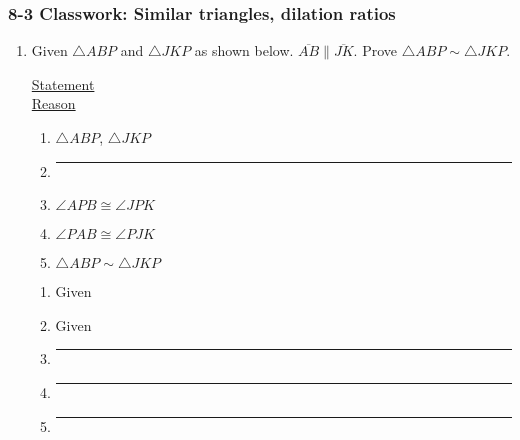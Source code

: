 \documentclass[12pt, twoside]{article}
\begin{document}
\subsubsection*{8-3 Classwork: Similar triangles, dilation ratios}
 \begin{enumerate}

\item Given $\triangle ABP$ and $\triangle JKP$ as shown below. $\overline{AB} \parallel \overline{JK}$. Prove $\triangle ABP \sim \triangle JKP$.\\[0.25cm]

  \begin{multicols}{2}
    \underline{Statement} \\
    \underline{Reason}
  \end{multicols}
  \begin{multicols}{2}
    \raggedcolumns
    \begin{enumerate}[label={\arabic*)}]
      \item $\triangle ABP$, $\triangle JKP$ \vspace{0.3cm}
      \item \rule{4cm}{0.15mm} \vspace{0.3cm}
      \item $\angle APB \cong \angle JPK$  \vspace{0.3cm}
      \item $\angle PAB \cong \angle PJK$ \vspace{0.3cm}
      \item $\triangle ABP \sim \triangle JKP$ \vspace{0.3cm}
    \end{enumerate}
    \begin{enumerate}[label={\arabic*)}]
      \item Given \vspace{0.3cm}
      \item Given \vspace{0.3cm}
      \item \rule{4cm}{0.15mm} \vspace{0.3cm}
      \item \rule{4cm}{0.15mm} \vspace{0.3cm}
      \item \rule{4cm}{0.15mm} \vspace{0.3cm}
    \end{enumerate}
  \end{multicols}


\end{enumerate}
\end{document}
